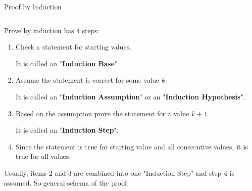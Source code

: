 \documentclass[9pt,aspectratio=169,handout]{beamer}
\begin{document}
\begin{frame}{Proof by Induction}
  \begin{columns}[T]
    \begin{column}{0.5\textwidth}
      Prove by induction has $4$ steps:

      \begin{enumerate}
        \item Check a statement for starting values.

        It is called an "\textbf{Induction Base}".

        \item Assume the statement is correct for some value $k$.
        
        It is called an "\textbf{Induction Assumption}" or an "\textbf{Induction Hypothesis}".

        \item Based on the assumption prove the statement for a value $k+1$.
        
        It is called an "\textbf{Induction Step}".

        \item Since the statement is true for starting value and all consecutive values, it is true for all values.
      \end{enumerate}\pause

      Usually, items 2 and 3 are combined into one "Induction Step" and step 4 is assumed. So general schema of the proof: 


\end{column}
\end{columns}
\end{frame}
\end{document}
